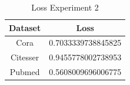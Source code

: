 \begin {table}[ht]
\caption {Loss Experiment 2} \label{tab:loss2} 
  \begin{center}
    \begin{tabular}{|c|c|}
    \hline
    Dataset    &  Loss\\ \hline
    Cora          & 0.7033339738845825 \\ 
    Citesser      & 0.9455778002738953 \\
    Pubmed        & 0.5608009696006775 \\
    \hline
    \end{tabular}
  \end{center}
\end{table}
